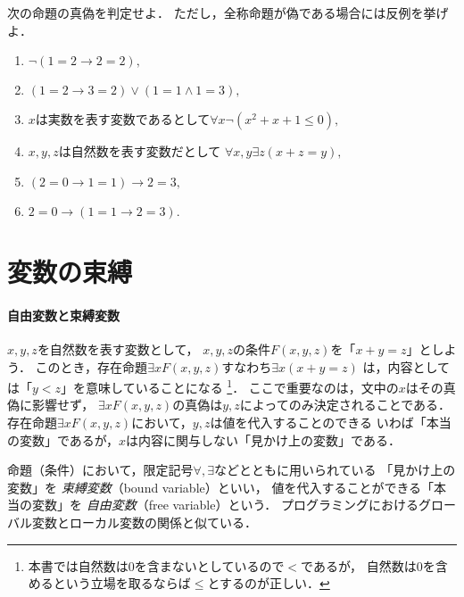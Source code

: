   \begin{que} \label{chp:sequent.sec:ronri.que:singihantei}
      次の命題の真偽を判定せよ．
      ただし，全称命題が偽である場合には反例を挙げよ．
        \begin{enumerate}
          \item $\lnot ( 1=2 \to 2=2),$ %
          \item $(1=2 \to 3=2) \lor ( 1=1 \land 1=3),$ %
          \item $x$は実数を表す変数であるとして$\forall x  \lnot ( x^2+x+1 \leq 0 ),$ %
          \item $x,  y,  z$は自然数を表す変数だとして
                $\forall x, y \exists z ( x + z =y),$ %
          \item $(2=0 \to 1=1) \to 2=3,$ %
          \item $2=0 \to ( 1=1 \to 2=3).$ %
        \end{enumerate}
  \end{que}
 \section{変数の束縛}
 \label{sec:hensuu}

\paragraph{自由変数と束縛変数}
 $x,  y,  z$を自然数を表す変数として，
 $x,  y,  z$の条件$F(x,y,z)$を「$x+y=z$」としよう．
 このとき，存在命題$\exists x F(x,y,z)$すなわち$\exists x ( x + y =z)$
 は，内容としては「$y < z$」を意味していることになる
 \footnote{本書では自然数は0を含まないとしているので$<$であるが，
 自然数は0を含めるという立場を取るならば$\leq$とするのが正しい．}．
 ここで重要なのは，文中の$x$はその真偽に影響せず，
 $\exists x F(x,y,z)$の真偽は$y,  z$によってのみ決定されることである．
 存在命題$\exists x F(x,y,z)$において，$y,  z$は値を代入することのできる
 いわば「本当の変数」であるが，$x$は内容に関与しない「見かけ上の変数」である．

 命題（条件）において，限定記号$\forall ,  \exists$などとともに用いられている
 「見かけ上の変数」を
 \emph{束縛変数}（bound variable）といい，
 値を代入することができる「本当の変数」を
 \emph{自由変数}（free variable）という．
 プログラミングにおけるグローバル変数とローカル変数の関係と似ている．

